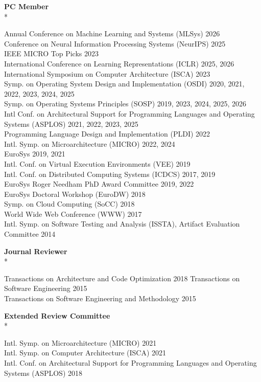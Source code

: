 \documentclass[10pt]{article}
\newcommand{\mysub}[3]{\textbf{#1} {#2} \hfill {\em #3}}
\newcommand{\myssub}[1]{%
  \par\begingroup
    \leftskip=2mm\relax
    \noindent #1\par
  \endgroup
  \vspace{1mm}%
}
\begin{document}
\mysub{PC Member}{}{}\\*
\myssub{\vspace{2mm}
  Annual Conference on Machine Learning and Systems (MLSys) \hfill 2026 \\
  Conference on Neural Information Processing Systems (NeurIPS) \hfill 2025 \\
  IEEE MICRO Top Picks \hfill 2023 \\
  International Conference on Learning Representations (ICLR) \hfill 2025, 2026\\
  International Symposium on Computer Architecture (ISCA) \hfill 2023 \\
  Symp. on Operating System Design and Implementation (OSDI) \hfill 2020, 2021, 2022, 2023, 2024, 2025 \\
  Symp. on Operating Systems Principles (SOSP) \hfill 2019, 2023, 2024, 2025, 2026 \\
  Intl Conf. on Architectural Support for Programming Languages and Operating Systems (ASPLOS) \hfill 2021, 2022, 2023, 2025 \\
  Programming Language Design and Implementation (PLDI) \hfill 2022 \\
  Intl. Symp. on Microarchitecture (MICRO) \hfill 2022, 2024 \\
  EuroSys \hfill 2019, 2021 \\
  Intl. Conf. on Virtual Execution Environments (VEE) \hfill 2019 \\
  Intl. Conf. on Distributed Computing Systems (ICDCS) \hfill 2017, 2019 \\
  EuroSys Roger Needham PhD Award Committee \hfill 2019, 2022 \\  
  EuroSys Doctoral Workshop (EuroDW) \hfill 2018 \\
  Symp. on Cloud Computing (SoCC) \hfill 2018 \\
  World Wide Web Conference (WWW) \hfill 2017 \\
  Intl. Symp. on Software Testing and Analysis (ISSTA), Artifact Evaluation Committee \hfill 2014 \\
}

\mysub{Journal Reviewer}{}{} \\*
\myssub{\vspace{2mm}Transactions on Architecture and Code Optimization \hfill 2018
  Transactions on Software Engineering \hfill 2015 \\
  Transactions on Software Engineering and Methodology \hfill 2015}

\mysub{Extended Review Committee}{}{}\\*
\myssub{\vspace{2mm}
  Intl. Symp. on Microarchitecture (MICRO) \hfill 2021 \\
  Intl. Symp. on Computer Architecture (ISCA) \hfill 2021 \\
  Intl. Conf. on Architectural Support for Programming Languages and Operating Systems (ASPLOS) \hfill 2018 \\
}
\end{document}
